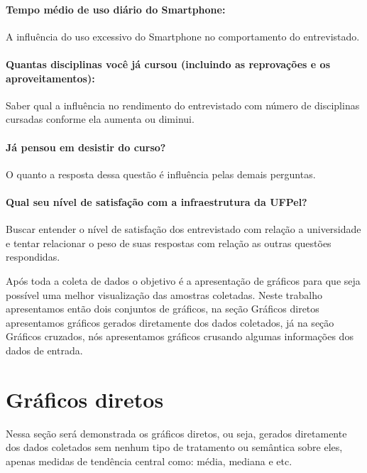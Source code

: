 \documentclass[11pt]{scrartcl} %
\begin{document}
\paragraph{\textbf{Tempo médio de uso diário do Smartphone:}} A influência do uso excessivo do Smartphone no comportamento do entrevistado.

\paragraph{\textbf{Quantas disciplinas você já cursou (incluindo as reprovações e os aproveitamentos):}} Saber qual a influência no rendimento do entrevistado com número de disciplinas cursadas conforme ela aumenta ou diminui.

\paragraph{\textbf{Já pensou em desistir do curso?}} O quanto a resposta dessa questão é influência pelas demais perguntas.  

\paragraph{\textbf{Qual seu nível de satisfação com a infraestrutura da UFPel?}} Buscar entender o nível de satisfação dos entrevistado com relação a universidade e tentar relacionar o peso de suas respostas com  relação as outras questões respondidas.

Após toda a coleta de dados o objetivo é a apresentação de gráficos para que seja possível uma melhor visualização das amostras coletadas. Neste trabalho apresentamos então dois conjuntos de gráficos, na seção Gráficos diretos apresentamos gráficos gerados diretamente dos dados coletados,
já na seção Gráficos cruzados, nós apresentamos gráficos crusando algumas informações dos dados de entrada.


\section{Gráficos diretos}

Nessa seção será demonstrada os gráficos diretos, ou seja, gerados diretamente dos dados coletados sem nenhum tipo de tratamento ou semântica sobre eles, apenas medidas de tendência central como: média, mediana e etc.
\end{document}
